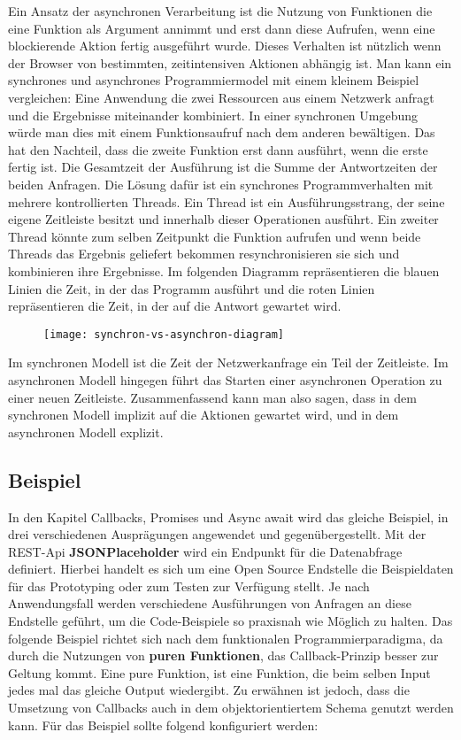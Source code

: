 Ein Ansatz der asynchronen Verarbeitung ist die Nutzung von Funktionen die eine Funktion als Argument annimmt und erst dann diese Aufrufen, wenn eine blockierende Aktion fertig ausgeführt wurde. Dieses Verhalten ist nützlich wenn der Browser von bestimmten, zeitintensiven Aktionen abhängig ist. Man kann ein synchrones und asynchrones Programmiermodel mit einem kleinem Beispiel vergleichen: Eine Anwendung die zwei Ressourcen aus einem Netzwerk anfragt und die Ergebnisse miteinander kombiniert. In einer synchronen Umgebung würde man dies mit einem Funktionsaufruf nach dem anderen bewältigen. Das hat den Nachteil, dass die zweite Funktion erst dann ausführt, wenn die erste fertig ist. Die Gesamtzeit der Ausführung ist die Summe der Antwortzeiten der beiden Anfragen. Die Lösung dafür ist ein synchrones Programmverhalten mit mehrere kontrollierten Threads. Ein Thread ist ein Ausführungsstrang, der seine eigene Zeitleiste besitzt und innerhalb dieser Operationen ausführt. Ein zweiter Thread könnte zum selben Zeitpunkt die Funktion aufrufen und wenn beide Threads das Ergebnis geliefert bekommen resynchronisieren sie sich und kombinieren ihre Ergebnisse. Im folgenden Diagramm repräsentieren die blauen Linien die Zeit, in der das Programm ausführt und die roten Linien repräsentieren die Zeit, in der auf die Antwort gewartet wird.\cite{asynchronitaet}

\begin{center}
\begin{figure}[H]
\texttt{[image: synchron-vs-asynchron-diagram]}
\end{figure}
\end{center}

\noindent
Im synchronen Modell ist die Zeit der Netzwerkanfrage ein Teil der Zeitleiste. Im asynchronen Modell hingegen führt das Starten einer asynchronen Operation zu einer neuen Zeitleiste. Zusammenfassend kann man also sagen, dass in dem synchronen Modell implizit auf die Aktionen gewartet wird, und in dem asynchronen Modell explizit.

\subsection{Beispiel}
In den Kapitel Callbacks, Promises und Async await wird das gleiche Beispiel, in drei verschiedenen Ausprägungen angewendet und gegenübergestellt. Mit der REST-Api \textbf{JSONPlaceholder} wird ein Endpunkt für die Datenabfrage definiert. Hierbei handelt es sich um eine Open Source Endstelle die Beispieldaten für das Prototyping oder zum Testen zur Verfügung stellt. Je nach Anwendungsfall werden verschiedene Ausführungen von Anfragen an diese Endstelle geführt, um die Code-Beispiele so praxisnah wie Möglich zu halten. Das folgende Beispiel richtet sich nach dem funktionalen Programmierparadigma, da durch die Nutzungen von \textbf{puren Funktionen}, das Callback-Prinzip besser zur Geltung kommt. Eine pure Funktion, ist eine Funktion, die beim selben Input jedes mal das gleiche Output wiedergibt. Zu erwähnen ist jedoch, dass die Umsetzung von Callbacks auch in dem objektorientiertem Schema genutzt werden kann. Für das Beispiel sollte folgend konfiguriert werden:


